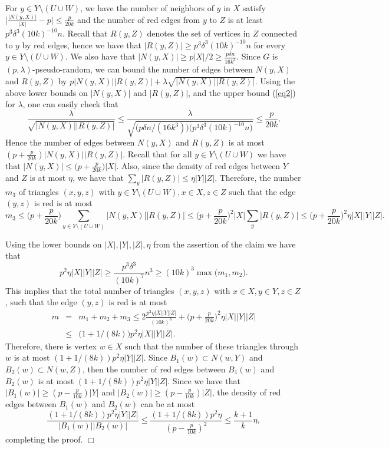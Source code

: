 \documentclass[11pt]{article}
\newenvironment{proof}
      {\medskip\noindent{\bf Proof.}\hspace{1mm}}
      {\hfill$\Box$\medskip}
\begin{document}
\begin{proof}
For $y \in Y \setminus (U \cup W)$, we have the number of neighbors
of $y$ in $X$ satisfy $\big|\frac{|N(y, X)|}{|X|}-p\big|\leq
\frac{p}{20k}$ and the number of red edges from $y$ to $Z$ is at
least $p^3\delta^3(10k)^{-10}n$. Recall that $R(y,Z)$ denotes the
set of vertices in $Z$ connected to $y$ by red edges, hence we have
that $|R(y,Z)| \geq p^3\delta^3(10k)^{-10}n$ for every $y \in Y
\setminus (U \cup W)$. We also have that $|N(y, X)| \geq p|X|/2 \geq
\frac{p\delta n}{16k^3}$. Since $G$ is $(p,\lambda)$-pseudo-random,
we can bound the number of edges between $N(y, X)$ and $R(y,Z)$ by
$p|N(y, X)||R(y,Z)|+\lambda\sqrt{|N(y, X)||R(y,Z)|}$. Using the
above lower bounds on $|N(y, X)|$ and $|R(y,Z)|$, and the upper
bound (\ref{eq2}) for $\lambda$, one can easily check that
$$\frac{\lambda}{\sqrt{|N(y, X)||R(y,Z)|}}
\leq\frac{\lambda}{\sqrt{\big(p\delta n/(16k^3)\big)
\big(p^3\delta^3(10k)^{-10}n\big)}} \leq \frac{p}{20k}.$$ Hence the
number of edges between $N(y, X)$ and $R(y,Z)$ is at most
$(p+\frac{p}{20k})|N(y, X)||R(y,Z)|$. Recall that for all
$y \in Y \setminus (U \cup W)$ we have that
$|N(y, X)| \leq \big(p+\frac{p}{20k}\big)|X|$. Also, since the density
of red edges between $Y$ and $Z$ is at most $\eta$, we have that
$\sum_y|R(y,Z)| \leq \eta|Y||Z|$. Therefore, the
number $m_3$ of triangles $(x,y,z)$ with $y \in Y \setminus (U \cup
W), x\in X, z\in Z$ such that the edge $(y,z)$ is red is at most
$$m_3 \leq \Big(p+\frac{p}{20k}\Big)\sum_{y \in Y \setminus (U \cup W)}
 |N(y, X)||R(y,Z)|\leq
\Big(p+\frac{p}{20k}\Big)^2|X|\sum_y|R(y,Z)| \leq
\Big(p+\frac{p}{20k}\Big)^2\eta|X||Y||Z|.$$

Using the lower bounds on $|X|, |Y|, |Z|, \eta$ from the assertion of the claim we have that
$$p^2\eta|X||Y||Z| \geq \frac{p^3\delta^3}{(10k)^7}n^3 \geq (10k)^3 \max\big(m_1, m_2\big).$$
This implies that the total number of
triangles $(x,y,z)$ with $x \in X, y \in Y, z \in Z$, such that
the edge $(y,z)$ is red is at most
\begin{eqnarray*}
m &=& m_1+m_2+m_3 \leq
2\frac{p^2\eta|X||Y||Z|}{(10k)^3}+\Big(p+\frac{p}{20k}\Big)^2\eta|X||Y||Z|\\
&\leq& \big(1+1/(8k)\big)p^2\eta|X||Y||Z|.\end{eqnarray*} Therefore,
there is vertex $w \in X$ such that the number of these triangles
through $w$ is at most $(1+1/(8k))p^2\eta|Y||Z|$. Since $B_1(w)
\subset N(w,Y)$ and $B_2(w) \subset N(w,Z)$, then the number of red
edges between $B_1(w)$ and $B_2(w)$ is at most
$(1+1/(8k))p^2\eta|Y||Z|$. Since we have that $|B_1(w)|\geq
(p-\frac{p}{10k})|Y|$ and $|B_2(w)| \geq (p-\frac{p}{10k})|Z|$, the
density of red edges between $B_1(w)$ and $B_2(w)$ can be at most
$$\frac{(1+1/(8k))p^2\eta|Y||Z|}{|B_1(w)||B_2(w)|} \leq \frac{(1+1/(8k))p^2\eta} {(p-\frac{p}{10k})^2} \leq
\frac{k+1}{k}\eta,$$ completing the proof.
\end{proof}
\end{document}
